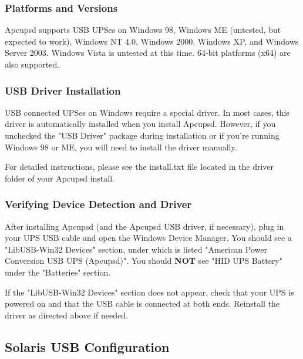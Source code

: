 \subsubsection*{Platforms and Versions}

Apcupsd supports USB UPSes on Windows 98, Windows ME (untested, but
expected to work), Windows NT 4.0, Windows 2000, Windows XP, and 
Windows Server 2003. Windows Vista is untested at this time. 64-bit
platforms (x64) are also supported.

\subsubsection*{USB Driver Installation}

USB connected UPSes on Windows require a special driver. In most cases, 
this driver is automatically installed when you install Apcupsd. However,
if you unchecked the "USB Driver" package during installation or if you're
running Windows 98 or ME, you will need to install the driver manually.

For detailed instructions, please see the install.txt file located in
the driver\\ folder of your Apcupsd install.

\subsubsection*{Verifying Device Detection and Driver}

After installing Apcupsd (and the Apcupsd USB driver, if necessary),
plug in your UPS USB cable and open the Windows Device Manager. You 
should see a "LibUSB-Win32 Devices" section, under which is listed 
"American Power Conversion USB UPS (Apcupsd)". You should {\bf NOT}
see "HID UPS Battery" under the "Batteries" section.

If the "LibUSB-Win32 Devices" section does not appear, check that
your UPS is powered on and that the USB cable is connected at
both ends. Reinstall the driver as directed above if needed.


\subsection*{Solaris USB Configuration}

